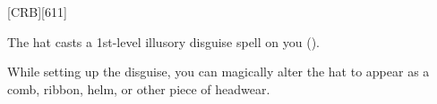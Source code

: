 
[CRB][611]





The hat casts a 1st-level illusory disguise spell on you ().

While setting up the disguise, you can magically alter the hat to appear as a comb, ribbon, helm, or other piece of headwear.

\vfill

\ItemBulk{-}

